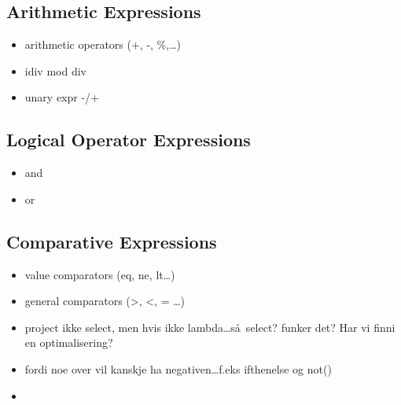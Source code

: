 \subsection{Arithmetic Expressions}
\label{sect:trans:TD:atrith}
\begin{itemize}
  \item arithmetic operators (+, -, \%,\ldots)
  \item idiv mod div
  \item unary expr -/+
\end{itemize}

\subsection{Logical Operator Expressions}
\label{sect:trans:TD:logical}
\begin{itemize}
  \item and
  \item or
\end{itemize}

\subsection{Comparative Expressions}
\label{sect:trans:TD:compArit}
\begin{itemize}
  \item value comparators (eq, ne, lt\ldots)
  \item general comparators (>, <, = \ldots)
  \item project ikke select, men hvis ikke lambda\ldots s\aa~select? funker det? Har vi finni en optimalisering?
  \item fordi noe over vil kanskje ha negativen\ldots f.eks ifthenelse og not()  \item 
\end{itemize}